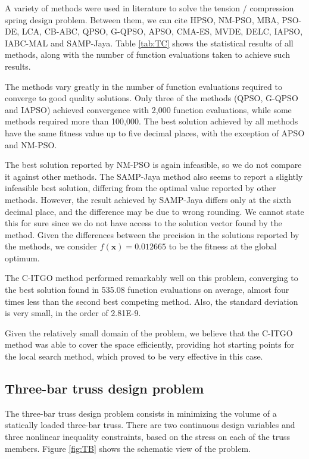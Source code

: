 A variety of methods were used in literature to solve the tension / compression spring design problem. Between them, we can cite HPSO, NM-PSO, MBA, PSO-DE, LCA, CB-ABC, QPSO, G-QPSO, APSO, CMA-ES, MVDE, DELC, IAPSO, IABC-MAL and SAMP-Jaya. Table \ref{tab:TC} shows the statistical results of all methods, along with the number of function evaluations taken to achieve such results.




The methods vary greatly in the number of function evaluations required to converge to good quality solutions. Only three of the methods (QPSO, G-QPSO and IAPSO) achieved convergence with 2,000 function evaluations, while some methods required more than 100,000. The best solution achieved by all methods have the same fitness value up to five decimal places, with the exception of APSO and NM-PSO.
 
The best solution reported by NM-PSO is again infeasible, so we do not compare it against other methods. The SAMP-Jaya method also seems to report a slightly infeasible best solution, differing from the optimal value reported by other methods. However, the result achieved by SAMP-Jaya differs only at the sixth decimal place, and the difference may be due to wrong rounding. We cannot state this for sure since we do not have access to the solution vector found by the method. Given the differences between the precision in the solutions reported by the methods, we consider $f(\bm{x}) = 0.012665$ to be the fitness at the global optimum.

The C-ITGO method performed remarkably well on this problem, converging to the best solution found in 535.08 function evaluations on average, almost four times less than the second best competing method. Also, the standard deviation is very small, in the order of 2.81E-9. 

Given the relatively small domain of the problem, we believe that the C-ITGO method was able to cover the space efficiently, providing hot starting points for the local search method, which proved to be very effective in this case.




\subsection{Three-bar truss design problem}

The three-bar truss design problem \citep{TB} consists in minimizing the volume of a statically loaded three-bar truss. There are two continuous design variables and three nonlinear inequality constraints, based on the stress on each of the truss members. Figure \ref{fig:TB} shows the schematic view of the problem.

